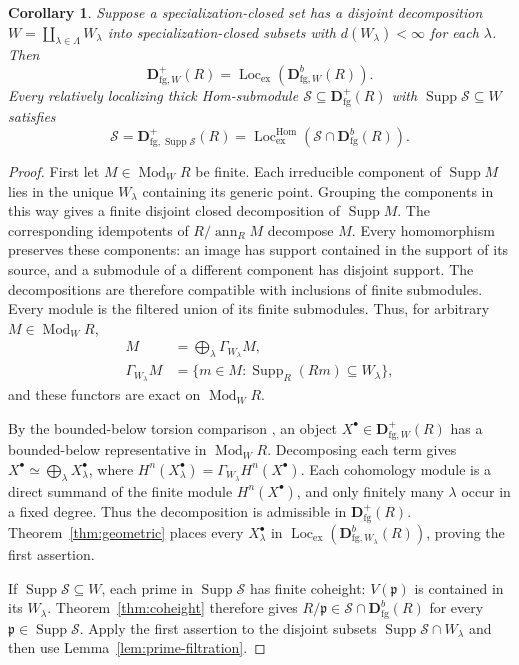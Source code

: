\documentclass[11pt]{amsart}
\numberwithin{equation}{section}
\newtheorem{corollary}[theorem]{Corollary}
\theoremstyle{definition}
\theoremstyle{remark}
\DeclareMathOperator{\Supp}{Supp}
\DeclareMathOperator{\Loc}{Loc}
\DeclareMathOperator{\Hom}{Hom}
\newcommand{\D}{\mathbf D}
\newcommand{\fg}{\mathrm{fg}}
\newcommand{\Lex}{\Loc_{\mathrm{ex}}}
\newcommand{\Lhom}{\Loc_{\mathrm{ex}}^{\Hom}}
\newcommand{\Mod}{\operatorname{Mod}}
\newcommand{\p}{\mathfrak p}
\begin{document}
\begin{corollary}\label{prop:pieces}
Suppose a specialization-closed set has a disjoint decomposition
$W=\coprod_{\lambda\in\Lambda}W_\lambda$ into specialization-closed subsets
with $d(W_\lambda)<\infty$ for each $\lambda$. Then
\[
 \D^+_{\fg,W}(R)=\Lex(\D^b_{\fg,W}(R)).
\]
Every relatively localizing thick Hom-submodule
$\mathcal S\subseteq\D^+_{\fg}(R)$ with $\Supp\mathcal S\subseteq W$ satisfies
\[
 \mathcal S=\D^+_{\fg,\Supp\mathcal S}(R)
 =\Lhom(\mathcal S\cap\D^b_{\fg}(R)).
\]
\end{corollary}
\begin{proof}
First let $M\in\Mod_W R$ be finite. Each irreducible component
of $\Supp M$ lies in the unique $W_\lambda$ containing its generic
point. Grouping the components in this way gives a finite disjoint
closed decomposition of $\Supp M$. The corresponding idempotents
of $R/\operatorname{ann}_R M$ decompose $M$.
Every homomorphism preserves these components: an image has support
contained in the support of its source, and a submodule of a different
component has disjoint support. The decompositions are therefore
compatible with inclusions of finite submodules. Every module is the filtered union of its finite submodules. Thus,
for arbitrary $M\in\Mod_W R$,
\[
 \begin{aligned}
 M&=\bigoplus_\lambda\Gamma_{W_\lambda}M,\\
 \Gamma_{W_\lambda}M&=
 \{m\in M:\Supp_R(Rm)\subseteq W_\lambda\},
 \end{aligned}
\]
and these functors are exact on $\Mod_W R$.

By the bounded-below torsion comparison
\cite[Lemma~51.5.4, Tag~0EF2]{Stacks}, an object
$X^{\bullet}\in\D^+_{\fg,W}(R)$ has a bounded-below representative
in $\Mod_W R$. Decomposing each term gives
$X^{\bullet}\simeq\bigoplus_\lambda X_\lambda^{\bullet}$, where
$H^n(X_\lambda^{\bullet})=\Gamma_{W_\lambda}H^n(X^{\bullet})$. Each cohomology module is a
direct summand of the finite module $H^n(X^{\bullet})$, and only finitely many
$\lambda$ occur in a fixed degree. Thus the decomposition is admissible
in $\D^+_{\fg}(R)$. Theorem~\ref{thm:geometric} places every $X_\lambda^{\bullet}$ in
$\Lex(\D^b_{\fg,W_\lambda}(R))$, proving the first assertion.

If $\Supp\mathcal S\subseteq W$, each prime in $\Supp\mathcal S$ has finite
coheight: $V(\p)$ is contained in its $W_\lambda$. Theorem~\ref{thm:coheight} therefore gives
$R/\p\in\mathcal S\cap\D^b_{\fg}(R)$ for every
$\p\in\Supp\mathcal S$. Apply the first assertion to the
disjoint subsets $\Supp\mathcal S\cap W_\lambda$ and then use
Lemma~\ref{lem:prime-filtration}.
\end{proof}
\end{document}
